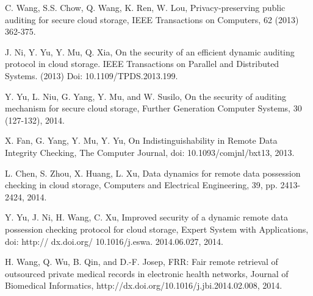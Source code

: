 \documentclass{article}
\begin{document}
\begin{thebibliography}{00}
    
    C. Wang, S.S. Chow, Q. Wang, K. Ren, W. Lou, Privacy-preserving public
    auditing for secure cloud storage, IEEE Transactions on Computers, 62 (2013) 362-375.
    
    J. Ni, Y. Yu, Y. Mu, Q. Xia, On the security of an efficient dynamic auditing protocol in cloud storage. IEEE Transactions on Parallel and Distributed Systems. (2013) Doi: 10.1109/TPDS.2013.199.
    
    Y. Yu, L. Niu, G. Yang, Y. Mu, and W. Susilo, On the security of auditing mechanism for secure cloud storage, Further Generation Computer Systems, 30 (127-132), 2014.
    
    X. Fan, G. Yang, Y. Mu, Y. Yu, On Indistinguishability in Remote Data Integrity Checking, The Computer Journal, doi: 10.1093/comjnl/bxt13, 2013.
    
    L. Chen, S. Zhou, X. Huang, L. Xu, Data dynamics for remote data possession checking in cloud storage, Computers and Electrical Engineering, 39, pp. 2413-2424, 2014.
    
    Y. Yu, J. Ni, H. Wang, C. Xu, Improved security of a dynamic remote data possession checking protocol for cloud storage, Expert System with Applications, doi: http:// dx.doi.org/ 10.1016/j.eswa. 2014.06.027, 2014.
    
    H. Wang, Q. Wu, B. Qin, and D.-F. Josep, FRR: Fair remote retrieval of outsourced private medical records in
    electronic health networks, Journal of Biomedical Informatics, http://dx.doi.org/10.1016/j.jbi.2014.02.008, 2014.
    
    
    \end{thebibliography}
\end{document}
